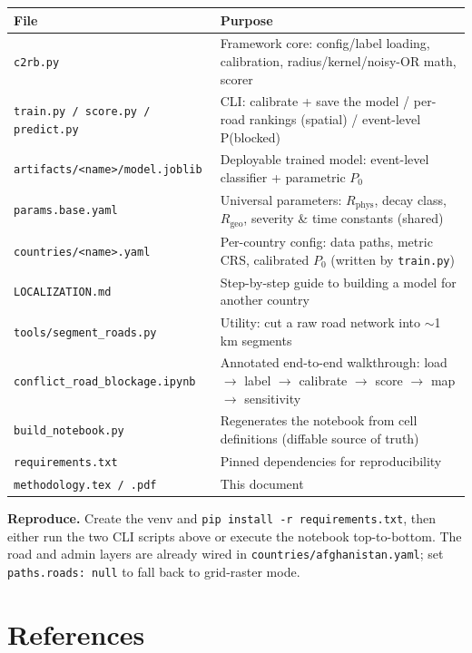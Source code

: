 \documentclass[11pt,a4paper]{article}
\newcommand{\code}[1]{\texttt{\small #1}}
\newcommand{\Rphys}{R_{\mathrm{phys}}}
\newcommand{\Rgeo}{R_{\mathrm{geo}}}
\begin{document}
\begin{table}[h]
\centering
\renewcommand{\arraystretch}{1.2}
\begin{tabularx}{\textwidth}{@{}l X@{}}
\toprule
\textbf{File} & \textbf{Purpose} \\
\midrule
\code{c2rb.py} & Framework core: config/label loading, calibration, radius/kernel/noisy-OR math, scorer \\
\code{train.py / score.py / predict.py} & CLI: calibrate + save the model / per-road rankings (spatial) / event-level P(blocked) \\
\code{artifacts/<name>/model.joblib} & Deployable trained model: event-level classifier + parametric $P_0$ \\
\code{params.base.yaml} & Universal parameters: $\Rphys$, decay class, $\Rgeo$, severity \& time constants (shared) \\
\code{countries/<name>.yaml} & Per-country config: data paths, metric CRS, calibrated $P_0$ (written by \code{train.py}) \\
\code{LOCALIZATION.md} & Step-by-step guide to building a model for another country \\
\code{tools/segment\_roads.py} & Utility: cut a raw road network into $\sim$1\,km segments \\
\code{conflict\_road\_blockage.ipynb} & Annotated end-to-end walkthrough: load $\to$ label $\to$ calibrate $\to$ score $\to$ map $\to$ sensitivity \\
\code{build\_notebook.py} & Regenerates the notebook from cell definitions (diffable source of truth) \\
\code{requirements.txt} & Pinned dependencies for reproducibility \\
\code{methodology.tex / .pdf} & This document \\
\bottomrule
\end{tabularx}
\end{table}

\textbf{Reproduce.} Create the venv and \code{pip install -r requirements.txt}, then either run the
two CLI scripts above or execute the notebook top-to-bottom. The road and admin layers are already
wired in \code{countries/afghanistan.yaml}; set \code{paths.roads: null} to fall back to
grid-raster mode.

\section{References}
\end{document}
